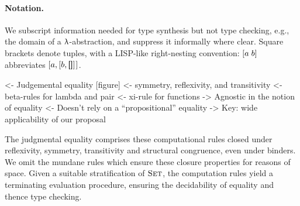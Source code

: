 \paragraph{Notation.} We subscript information needed for type synthesis
but not type checking, e.g., the domain of a \(\LAMBINDER\)-abstraction,
and suppress it informally where clear. Square brackets denote tuples,
with a LISP-like right-nesting convention: \(\sqr{a\;b}\) abbreviates
\(\pair{a}{\pair{b}{\void}{}}{}\).



%
%
%
%


\begin{wstructure}
<- Judgemental equality [figure]
    <- symmetry, reflexivity, and transitivity
    <- beta-rules for lambda and pair
    <- xi-rule for functions
    -> Agnostic in the notion of equality
        <- Doesn't rely on a ``propositional'' equality
        -> Key: wide applicability of our proposal
\end{wstructure}

The judgmental equality comprises these computational rules
 closed under reflexivity,
symmetry, transitivity and structural congruence, even under binders.
We omit the mundane rules which ensure these closure properties for
reasons of space. Given a suitable stratification of \(\Set\), the
computation rules yield a terminating evaluation procedure, ensuring
the decidability of equality and thence type checking.

